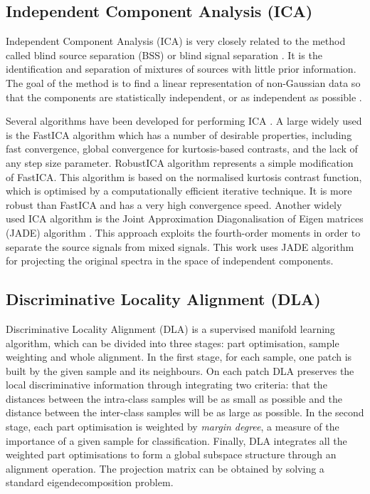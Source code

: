 \documentclass[a4paper,fleqn,usenatbib]{mnras}
\begin{document}
\subsection{Independent Component Analysis (ICA)}

Independent Component Analysis (ICA) \citep{comon:94} is very closely
related to the method called blind source separation (BSS) or blind
signal separation \citep{jutten:91}. It is the identification and
separation of mixtures of sources with little prior information. The
goal of the method is to find a linear representation of non-Gaussian
data so that the components are statistically independent, or as
independent as possible \citep{hyvarinen:00}.

Several algorithms have been developed for performing ICA
\citep{bell:95,belouchrani:97,ollila:06,li:08}. A large widely used is
the FastICA algorithm \citep{hyvarinen:00} which has a number of
desirable properties, including fast convergence, global convergence
for kurtosis-based contrasts, and the lack of any step size parameter.
RobustICA algorithm \citep{zarzoso:10} represents a simple modification
of FastICA. This algorithm is based on the normalised kurtosis
contrast function, which is optimised by a computationally efficient
iterative technique. It is more robust than FastICA and has a very
high convergence speed.  Another widely used ICA algorithm is the
Joint Approximation Diagonalisation of Eigen matrices (JADE) algorithm
\citep{cardoso:93}. This approach exploits the fourth-order moments in
order to separate the source signals from mixed signals. This work
uses JADE algorithm for projecting the original spectra in the space
of independent components.


\subsection{Discriminative Locality Alignment (DLA)}
Discriminative Locality Alignment (DLA) \citep{zhang:2008} is a
supervised manifold learning algorithm, which can be divided into
three stages: part optimisation, sample weighting and whole
alignment. In the first stage, for each sample, one patch is built by
the given sample and its neighbours. On each patch DLA preserves the
local discriminative information through integrating two criteria:
that the distances between the intra-class samples will be as small as
possible and the distance between the inter-class samples will be as
large as possible. In the second stage, each part optimisation is
weighted by \textit{margin degree}, a measure of the importance of a
given sample for classification. Finally, DLA integrates all the
weighted part optimisations to form a global subspace structure
through an alignment operation. The projection matrix can be obtained
by solving a standard eigendecomposition problem.
\end{document}
